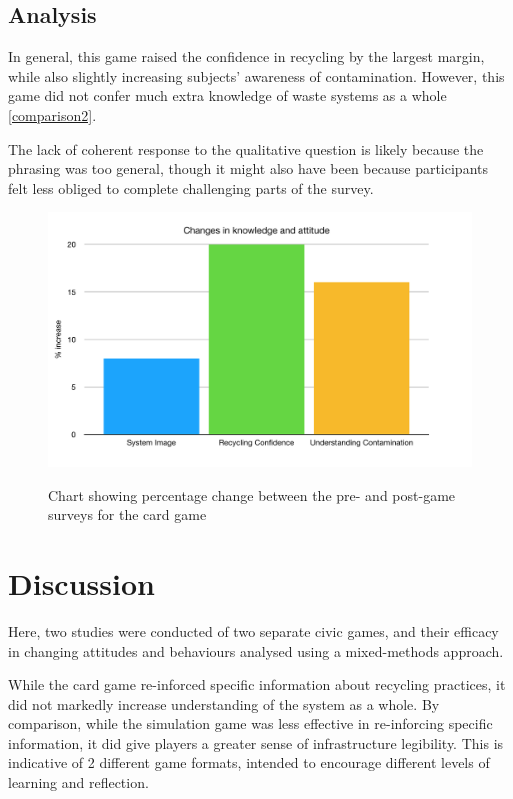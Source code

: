 \documentclass[nofonts,nols,justified,nobib]{tufte-book}
\begin{document}
\subsection*{Analysis} 
In general, this game raised the confidence in recycling by the largest margin, while also slightly increasing subjects' awareness of contamination. However, this game did not confer much extra knowledge of waste systems as a whole \ref{comparison2}.

The lack of coherent response to the qualitative question is likely because the phrasing was too general, though it might also have been because participants felt less obliged to complete challenging parts of the survey. 


\begin{figure}
  \label{comparison2}
  \caption{Chart showing percentage change between the pre- and post-game surveys for the card game}
  \includegraphics[width=1\linewidth]{img/4/attitude-changes-llk.png}
  \label{contamination}
\end{figure}

\newpage

\section*{Discussion}
Here, two studies were conducted of two separate civic games, and their efficacy in changing attitudes and behaviours analysed using a mixed-methods approach.

While the card game re-inforced specific information about recycling practices, it did not markedly increase understanding of the system as a whole. By comparison, while the simulation game was less effective in re-inforcing specific information, it did give players a greater sense of infrastructure legibility. This is indicative of 2 different game formats, intended to encourage different levels of learning and reflection.
\end{document}
